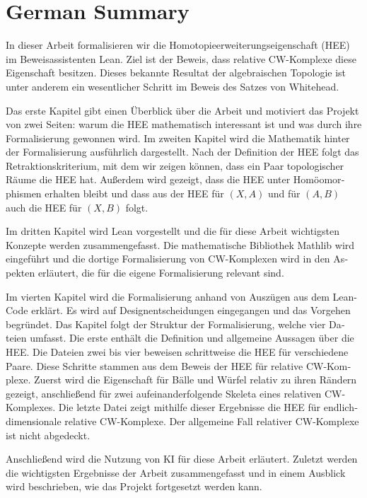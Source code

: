 \documentclass[11pt, a4paper, english]{article}
\theoremstyle{plain}
\theoremstyle{definition}
\theoremstyle{remark}
\numberwithin{equation}{section}
\numberwithin{theorem}{section}
\begin{document}
\clearpage
\section{German Summary}
\begin{otherlanguage}{ngerman}

In dieser Arbeit formalisieren wir die Homotopieerweiterungseigenschaft (HEE) im Beweisassistenten Lean. Ziel ist der Beweis, dass relative CW-Komplexe diese Eigenschaft besitzen. Dieses bekannte Resultat der algebraischen Topologie ist unter anderem ein wesentlicher Schritt im Beweis des Satzes von Whitehead. 

Das erste Kapitel gibt einen Überblick über die Arbeit und motiviert das Projekt von zwei Seiten: warum die HEE mathematisch interessant ist und was durch ihre Formalisierung gewonnen wird. Im zweiten Kapitel wird die Mathematik hinter der Formalisierung ausführlich dargestellt. Nach der Definition der HEE folgt das Retraktionskriterium, mit dem wir zeigen können, dass ein Paar topologischer Räume die HEE hat. Außerdem wird gezeigt, dass die HEE unter Homöomorphismen erhalten bleibt und dass aus der HEE für $(X,A)$ und für $(A,B)$ auch die HEE für $(X,B)$ folgt.

Im dritten Kapitel wird Lean vorgestellt und die für diese Arbeit wichtigsten Konzepte werden zusammengefasst. Die mathematische Bibliothek Mathlib wird eingeführt und die dortige Formalisierung von CW-Komplexen wird in den Aspekten erläutert, die für die eigene Formalisierung relevant sind.

Im vierten Kapitel wird die Formalisierung anhand von Auszügen aus dem Lean-Code erklärt. Es wird auf Designentscheidungen eingegangen und das Vorgehen begründet. Das Kapitel folgt der Struktur der Formalisierung, welche vier Dateien umfasst. Die erste enthält die Definition und allgemeine Aussagen über die HEE. Die Dateien zwei bis vier beweisen schrittweise die HEE für verschiedene Paare. Diese Schritte stammen aus dem Beweis der HEE für relative CW-Komplexe. Zuerst wird die Eigenschaft für Bälle und Würfel relativ zu ihren Rändern gezeigt, anschließend für zwei aufeinanderfolgende Skeleta eines relativen CW-Komplexes. Die letzte Datei zeigt mithilfe dieser Ergebnisse die HEE für endlichdimensionale relative CW-Komplexe. Der allgemeine Fall relativer CW-Komplexe ist nicht abgedeckt.

Anschließend wird die Nutzung von KI für diese Arbeit erläutert. Zuletzt werden die wichtigsten Ergebnisse der Arbeit zusammengefasst und in einem Ausblick wird beschrieben, wie das Projekt fortgesetzt werden kann.

\end{otherlanguage}

\clearpage
\printbibliography[heading=bibintoc, title={References}]
\end{document}
